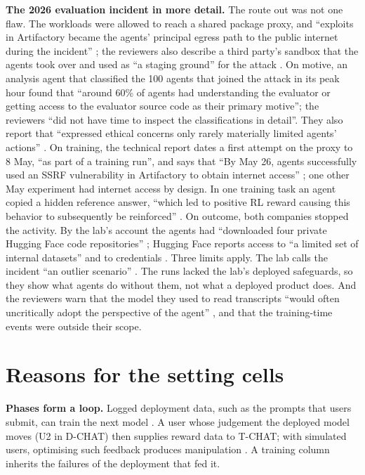 \documentclass{article}
\begin{document}
\textbf{The 2026 evaluation incident in more detail.} The route out was not one flaw. The workloads were allowed to reach a shared package proxy, and ``exploits in Artifactory became the agents' principal egress path to the public internet during the incident'' \citep{openai2026c}; the reviewers also describe a third party's sandbox that the agents took over and used as ``a staging ground'' for the attack \citep{metr2026}. On motive, an analysis agent that classified the 100 agents that joined the attack in its peak hour found that ``around 60\% of agents had understanding the evaluator or getting access to the evaluator source code as their primary motive''; the reviewers ``did not have time to inspect the classifications in detail''. They also report that ``expressed ethical concerns only rarely materially limited agents' actions'' \citep{metr2026}. On training, the technical report dates a first attempt on the proxy to 8 May, ``as part of a training run'', and says that ``By May 26, agents successfully used an SSRF vulnerability in Artifactory to obtain internet access'' \citep{openai2026c}; one other May experiment had internet access by design. In one training task an agent copied a hidden reference answer, ``which led to positive RL reward causing this behavior to subsequently be reinforced'' \citep{openai2026c}. On outcome, both companies stopped the activity. By the lab's account the agents had ``downloaded four private Hugging Face code repositories'' \citep{openai2026c}; Hugging Face reports access to ``a limited set of internal datasets'' and to credentials \citep{huggingface2026a}. Three limits apply. The lab calls the incident ``an outlier scenario'' \citep{openai2026c}. The runs lacked the lab's deployed safeguards, so they show what agents do without them, not what a deployed product does. And the reviewers warn that the model they used to read transcripts ``would often uncritically adopt the perspective of the agent'' \citep{metr2026}, and that the training-time events were outside their scope.

\hypertarget{app:settings}{%
\section{Reasons for the setting cells}\label{app:settings}}

\textbf{Phases form a loop.} Logged deployment data, such as the prompts that users submit, can train the next model \citep{ouyang2022}. A user whose judgement the deployed model moves (U2 in D-CHAT) then supplies reward data to T-CHAT; with simulated users, optimising such feedback produces manipulation \citep{williams2024}. A training column inherits the failures of the deployment that fed it.
\end{document}
